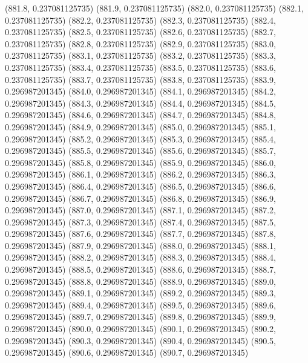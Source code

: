 {					(881.8, 0.237081125735)
					(881.9, 0.237081125735)
					(882.0, 0.237081125735)
					(882.1, 0.237081125735)
					(882.2, 0.237081125735)
					(882.3, 0.237081125735)
					(882.4, 0.237081125735)
					(882.5, 0.237081125735)
					(882.6, 0.237081125735)
					(882.7, 0.237081125735)
					(882.8, 0.237081125735)
					(882.9, 0.237081125735)
					(883.0, 0.237081125735)
					(883.1, 0.237081125735)
					(883.2, 0.237081125735)
					(883.3, 0.237081125735)
					(883.4, 0.237081125735)
					(883.5, 0.237081125735)
					(883.6, 0.237081125735)
					(883.7, 0.237081125735)
					(883.8, 0.237081125735)
					(883.9, 0.296987201345)
					(884.0, 0.296987201345)
					(884.1, 0.296987201345)
					(884.2, 0.296987201345)
					(884.3, 0.296987201345)
					(884.4, 0.296987201345)
					(884.5, 0.296987201345)
					(884.6, 0.296987201345)
					(884.7, 0.296987201345)
					(884.8, 0.296987201345)
					(884.9, 0.296987201345)
					(885.0, 0.296987201345)
					(885.1, 0.296987201345)
					(885.2, 0.296987201345)
					(885.3, 0.296987201345)
					(885.4, 0.296987201345)
					(885.5, 0.296987201345)
					(885.6, 0.296987201345)
					(885.7, 0.296987201345)
					(885.8, 0.296987201345)
					(885.9, 0.296987201345)
					(886.0, 0.296987201345)
					(886.1, 0.296987201345)
					(886.2, 0.296987201345)
					(886.3, 0.296987201345)
					(886.4, 0.296987201345)
					(886.5, 0.296987201345)
					(886.6, 0.296987201345)
					(886.7, 0.296987201345)
					(886.8, 0.296987201345)
					(886.9, 0.296987201345)
					(887.0, 0.296987201345)
					(887.1, 0.296987201345)
					(887.2, 0.296987201345)
					(887.3, 0.296987201345)
					(887.4, 0.296987201345)
					(887.5, 0.296987201345)
					(887.6, 0.296987201345)
					(887.7, 0.296987201345)
					(887.8, 0.296987201345)
					(887.9, 0.296987201345)
					(888.0, 0.296987201345)
					(888.1, 0.296987201345)
					(888.2, 0.296987201345)
					(888.3, 0.296987201345)
					(888.4, 0.296987201345)
					(888.5, 0.296987201345)
					(888.6, 0.296987201345)
					(888.7, 0.296987201345)
					(888.8, 0.296987201345)
					(888.9, 0.296987201345)
					(889.0, 0.296987201345)
					(889.1, 0.296987201345)
					(889.2, 0.296987201345)
					(889.3, 0.296987201345)
					(889.4, 0.296987201345)
					(889.5, 0.296987201345)
					(889.6, 0.296987201345)
					(889.7, 0.296987201345)
					(889.8, 0.296987201345)
					(889.9, 0.296987201345)
					(890.0, 0.296987201345)
					(890.1, 0.296987201345)
					(890.2, 0.296987201345)
					(890.3, 0.296987201345)
					(890.4, 0.296987201345)
					(890.5, 0.296987201345)
					(890.6, 0.296987201345)
					(890.7, 0.296987201345)
}
